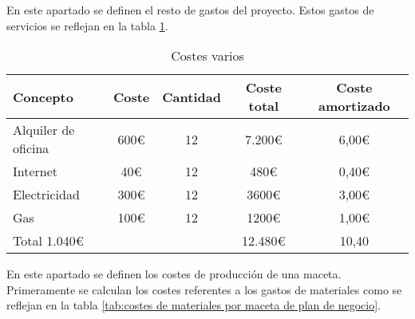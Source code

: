             En este apartado se definen el resto de gastos del proyecto. Estos gastos de servicios se reflejan en la tabla \ref{tab:costes de servicios de plan de negocio}.
            \begin{table}[H]
                \centering
                \caption{Costes varios}
                \begin{tabular}{|l|c|c|c|c|}
                    \hline
                    Concepto & Coste & Cantidad & Coste total & Coste amortizado \\
                    \hline
                    Alquiler de oficina & 600€ & 12 & 7.200€ & 6,00€ \\
                    Internet & 40€ & 12 & 480€ & 0,40€ \\
                    Electricidad & 300€ & 12 & 3600€ & 3,00€ \\
                    Gas & 100€ & 12 & 1200€ & 1,00€ \\
                    \hline
                    Total 1.040€ & & & 12.480€ & 10,40\\
                    \hline
                \end{tabular}
                \label{tab:costes de servicios de plan de negocio}
            \end{table}
            En este apartado se definen los costes de producción de una maceta. Primeramente se calculan los costes referentes a los gastos de materiales como se reflejan en la tabla \ref{tab:costes de materiales por maceta de plan de negocio}.
